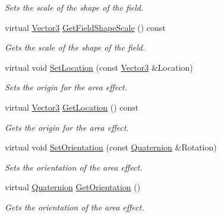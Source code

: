 \begin{DoxyCompactItemize}
\begin{DoxyCompactList}\small\item\em Sets the scale of the shape of the field. \item\end{DoxyCompactList}\item 
virtual \hyperlink{classphys_1_1Vector3}{Vector3} \hyperlink{classphys_1_1AreaEffect_a4157e5e4142cbc3f0908942b4271b9b7}{GetFieldShapeScale} () const 
\begin{DoxyCompactList}\small\item\em Gets the scale of the shape of the field. \item\end{DoxyCompactList}\item 
virtual void \hyperlink{classphys_1_1AreaEffect_a6d1499c36db3bbb5341ee3aa2e90b52f}{SetLocation} (const \hyperlink{classphys_1_1Vector3}{Vector3} \&Location)
\begin{DoxyCompactList}\small\item\em Sets the origin for the area effect. \item\end{DoxyCompactList}\item 
virtual \hyperlink{classphys_1_1Vector3}{Vector3} \hyperlink{classphys_1_1AreaEffect_ac3ca23ffdcec077d0e7f36a471602b88}{GetLocation} () const 
\begin{DoxyCompactList}\small\item\em Gets the origin for the area effect. \item\end{DoxyCompactList}\item 
virtual void \hyperlink{classphys_1_1AreaEffect_a426c3cb70e8de1fc90d4acdf2e425cd6}{SetOrientation} (const \hyperlink{classphys_1_1Quaternion}{Quaternion} \&Rotation)
\begin{DoxyCompactList}\small\item\em Sets the orientation of the area effect. \item\end{DoxyCompactList}\item 
virtual \hyperlink{classphys_1_1Quaternion}{Quaternion} \hyperlink{classphys_1_1AreaEffect_a48946a43238686044cb4101a218102d6}{GetOrientation} ()
\begin{DoxyCompactList}\small\item\em Gets the orientation of the area effect. \item\end{DoxyCompactList}\item 

\end{DoxyCompactItemize}
